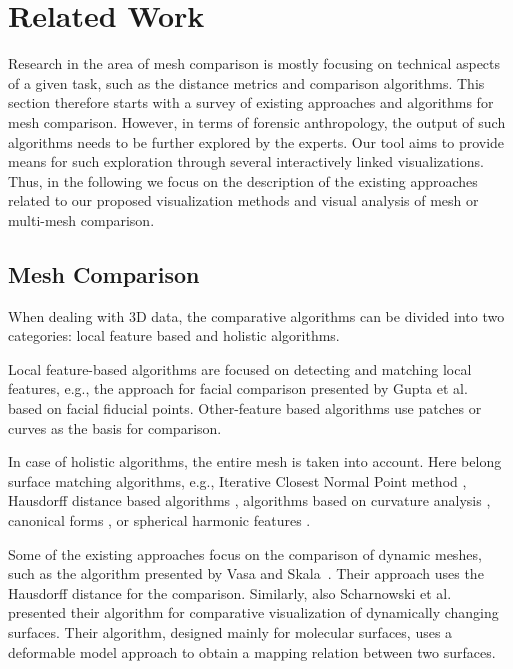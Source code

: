 \documentclass[final,5p,times]{elsarticle}
\begin{document}

\section{Related Work} \label{related}
Research in the area of mesh comparison is mostly focusing on technical aspects of a given task, such as the distance metrics and comparison algorithms.
This section therefore starts with a survey of existing approaches and algorithms for mesh comparison.
However, in terms of forensic anthropology, the output of such algorithms needs to be further explored by the experts.
Our tool aims to provide means for such exploration through several interactively linked visualizations.
Thus, in the following we focus on the description of the existing approaches related to our proposed visualization methods and visual analysis of mesh or multi-mesh comparison.

\subsection{Mesh Comparison}
When dealing with 3D data, the comparative algorithms can be divided into two categories: local feature based and holistic algorithms.

Local feature-based algorithms are focused on detecting and matching local features, e.g., the approach for facial comparison presented by Gupta et al.~\cite{gupta2010anthropometric} based on facial fiducial points. 
Other-feature based algorithms use patches \cite{guo2016ei3d,chua20003d} or curves \cite{bronstein2005three} as the basis for comparison. 

In case of holistic algorithms, the entire mesh is taken into account.
Here belong surface matching algorithms, e.g., Iterative Closest Normal Point method \cite{mohammadzade2013iterative}, Hausdorff distance based algorithms \cite{huttenlocher1993comparing,pan2003automatic}, algorithms based on curvature analysis \cite{lei20093d,tanaka1998curvature}, canonical forms \cite{bronstein2007expression}, or spherical harmonic features \cite{liu2013learning}.

Some of the existing approaches focus on the comparison of dynamic meshes, such as the algorithm presented by Vasa and Skala~\cite{Vasa2006}.
Their approach uses the Hausdorff distance for the comparison.
Similarly, also Scharnowski et al.~\cite{Scharnowski2014} presented their algorithm for comparative visualization of dynamically changing surfaces.
Their algorithm, designed mainly for molecular surfaces, uses a deformable model approach to obtain a mapping relation between two surfaces.
\end{document}
